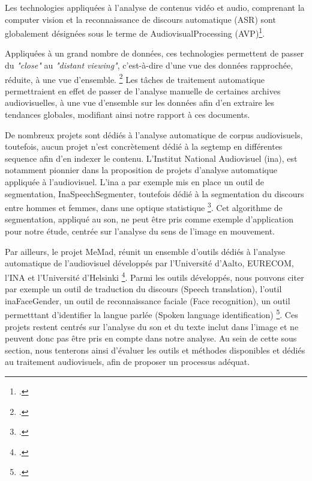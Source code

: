 
Les technologies appliquées à l'analyse de contenus vidéo et audio, comprenant la computer vision et la reconnaissance de discours automatique (ASR) sont globalement désignées sous le terme de \gls{AudiovisualProcessing} (AVP)\footcite{noord2021}.

Appliquées à un grand nombre de données, ces technologies permettent de passer du \textit{"close"} au \textit{"distant viewing"}, c’est-à-dire d’une vue des données rapprochée, réduite, à une vue d’ensemble. \footcite{noord2021} Les tâches de traitement automatique permettraient en effet de passer de l’analyse manuelle de certaines archives audiovisuelles, à une vue d'ensemble sur les données afin d'en extraire les tendances globales, modifiant ainsi notre rapport à ces documents. 

De nombreux projets sont dédiés à l’analyse automatique de corpus audiovisuels, toutefois, aucun projet n’est concrètement dédié à la \gls{segtemp} en différentes \gls{sequence} afin d'en indexer le contenu. L’Institut National Audiovisuel (\gls{ina}), est notamment pionnier dans la proposition de projets d’analyse automatique appliquée à l’audiovisuel. L’\gls{ina} a par exemple mis en place un outil de segmentation, InaSpeechSegmenter, toutefois dédié à la segmentation du discours entre hommes et femmes, dans une optique statistique \footcite{zotero-item-787}. Cet algorithme de segmentation, appliqué au son, ne peut être pris comme exemple d’application pour notre étude, centrée sur l’analyse du sens de l’image en mouvement.  

Par ailleurs, le projet MeMad, réunit un ensemble d’outils dédiés à l’analyse automatique de l’audiovisuel développés par l’Université d’Aalto, EURECOM, l’INA et l'Université d'Helsinki \footcite{zotero-item-790}. Parmi les outils développés, nous pouvons citer par exemple un outil de traduction du discours (Speech translation), l’outil inaFaceGender, un outil de reconnaissance faciale (Face recognition), un outil permetttant d’identifier la langue parlée (Spoken language identification) \footcite{zotero-item-790}. Ces projets restent centrés sur l’analyse du son et du texte inclut dans l’image et ne peuvent donc pas être pris en compte dans notre analyse. 
Au sein de cette sous section, nous tenterons ainsi d'évaluer les outils et méthodes disponibles et dédiés au traitement audiovisuels, afin de proposer un processus adéquat. 

